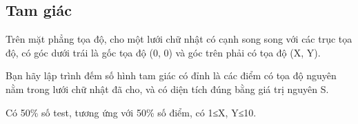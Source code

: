 \subsection{   Tam giác  }

   Trên mặt phẳng tọa độ, cho một lưới chữ nhật có cạnh song song với các trục tọa độ,  có góc dưới   trái là gốc tọa độ (0, 0) và góc trên phải  có tọa độ (X, Y).  

   Bạn hãy lập trình đếm số hình tam giác có đỉnh là các điểm có tọa độ nguyên nằm trong lưới chữ   nhật đã cho, và có diện tích đúng bằng giá trị nguyên S.  

Có 50\% số test, tương ứng với 50\% số điểm, có 1≤X, Y≤10.